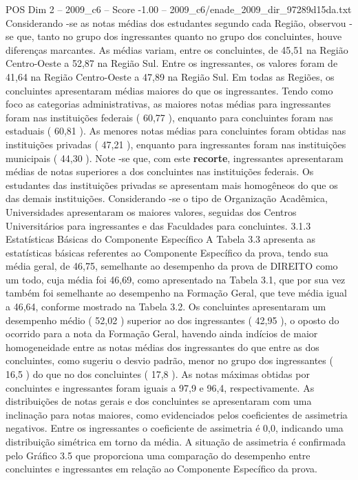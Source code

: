 \begin{textsample}{POS Dim 2 – 2009\_c6 – Score -1.00 – 2009\_c6/enade\_2009\_dir\_97289d15da.txt}
Considerando -se as notas médias dos estudantes segundo cada Região, observou -se que, tanto no grupo dos ingressantes quanto no grupo dos concluintes, houve diferenças marcantes.
As médias variam, entre os concluintes, de 45,51 na Região Centro-Oeste a 52,87 na Região Sul.
Entre os ingressantes, os valores foram de 41,64 na Região Centro-Oeste a 47,89 na Região Sul.
Em todas as Regiões, os concluintes apresentaram médias maiores do que os ingressantes.
Tendo como foco as categorias administrativas, as maiores notas médias para ingressantes foram nas instituições federais ( 60,77 ), enquanto para concluintes foram nas estaduais ( 60,81 ).
As menores notas médias para concluintes foram obtidas nas instituições privadas ( 47,21 ), enquanto para ingressantes foram nas instituições municipais ( 44,30 ).
Note -se que, com este \textbf{recorte}, ingressantes apresentaram médias de notas superiores a dos concluintes nas instituições federais.
Os estudantes das instituições privadas se apresentam mais homogêneos do que os das demais instituições.
Considerando -se o tipo de Organização Acadêmica, Universidades apresentaram os maiores valores, seguidas dos Centros Universitários para ingressantes e das Faculdades para concluintes. 3.1.3 Estatísticas Básicas do Componente Específico A Tabela 3.3 apresenta as estatísticas básicas referentes ao Componente Específico da prova, tendo sua média geral, de 46,75, semelhante ao desempenho da prova de DIREITO como um todo, cuja média foi 46,69, como apresentado na Tabela 3.1, que por sua vez também foi semelhante ao desempenho na Formação Geral, que teve média igual a 46,64, conforme mostrado na Tabela 3.2.
Os concluintes apresentaram um desempenho médio ( 52,02 ) superior ao dos ingressantes ( 42,95 ), o oposto do ocorrido para a nota da Formação Geral, havendo ainda indícios de maior homogeneidade entre as notas médias dos ingressantes do que entre as dos concluintes, como sugeriu o desvio padrão, menor no grupo dos ingressantes ( 16,5 ) do que no dos concluintes ( 17,8 ).
As notas máximas obtidas por concluintes e ingressantes foram iguais a 97,9 e 96,4, respectivamente.
As distribuições de notas gerais e dos concluintes se apresentaram com uma inclinação para notas maiores, como evidenciados pelos coeficientes de assimetria negativos.
Entre os ingressantes o coeficiente de assimetria é 0,0, indicando uma distribuição simétrica em torno da média.
A situação de assimetria é confirmada pelo Gráfico 3.5 que proporciona uma comparação do desempenho entre concluintes e ingressantes em relação ao Componente Específico da prova.

\end{textsample}
